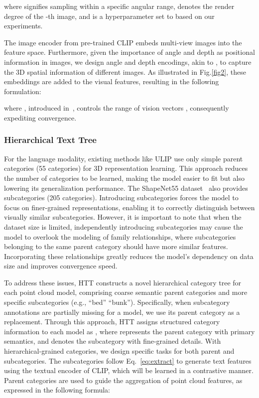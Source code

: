 \documentclass[sigconf]{acmart}
\begin{document}
where  signifies sampling within a specific angular range,  denotes the render degree of the -th image, and  is a hyperparameter set to  based on our experiments.

The image encoder from pre-trained CLIP embeds multi-view images into the feature space. Furthermore, given the importance of angle and depth as positional information in images, we design angle and depth encodings, akin to \cite{vaswani2017attention}, to capture the 3D spatial information of different images. As illustrated in Fig.\ref{fig2}, these embeddings are added to the visual features, resulting in the following formulation:

where , introduced in~\cite{1607.06450}, controls the range of vision vectors , consequently expediting convergence.

\subsubsection{\textbf{Hierarchical Text Tree}}
For the language modality, existing methods like ULIP use only simple parent categories (55 categories) for 3D representation learning. This approach reduces the number of categories to be learned, making the model easier to fit but also lowering its generalization performance. The ShapeNet55 dataset~\cite{chang2015shapenet} also provides subcategories (205 categories). Introducing subcategories forces the model to focus on finer-grained representations, enabling it to correctly distinguish between visually similar subcategories. However, it is important to note that when the dataset size is limited, independently introducing subcategories may cause the model to overlook the modeling of family relationships, where subcategories belonging to the same parent category should have more similar features. Incorporating these relationships greatly reduces the model's dependency on data size and improves convergence speed.

To address these issues, HTT constructs a novel hierarchical category tree for each point cloud model, comprising coarse semantic parent categories and more specific subcategories (e.g., ``bed''  ``bunk''). Specifically, when subcategory annotations are partially missing for a model, we use its parent category as a replacement. Through this approach, HTT assigns structured category information to each model as , where  represents the parent category with primary semantics, and  denotes the subcategory with fine-grained details.
With hierarchical-grained categories, we design specific tasks for both parent and subcategories. The subcategories  follow Eq.~\ref{eq:extract} to generate text features using the textual encoder of CLIP, which will be learned in a contrastive manner. Parent categories are used to guide the aggregation of point cloud features, as expressed in the following formula:
\end{document}
